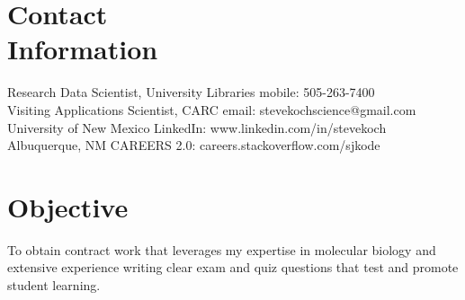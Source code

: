 \documentclass[margin,line]{resume}
\begin{document}
\begin{resume}

    \section{\mysidestyle Contact\\Information}

    Research Data Scientist, University Libraries                \hfill mobile: 505-263-7400          \vspace{0mm}\\\vspace{0mm}%
    Visiting Applications Scientist, CARC                                \hfill email: stevekochscience@gmail.com          \vspace{0mm}\\\vspace{0mm}%
    University of New Mexico                                         \hfill LinkedIn: www.linkedin.com/in/stevekoch  \vspace{0mm}\\\vspace{0mm}%
    Albuquerque, NM                                         \hfill CAREERS 2.0: careers.stackoverflow.com/sjkode  \vspace{0mm}\\\vspace{-4.5mm}%


    \section{\mysidestyle Objective}

    To obtain contract work that leverages my expertise in molecular biology and extensive experience writing clear exam and quiz questions that test and promote student learning.

%
%

\end{resume}
\end{document}
